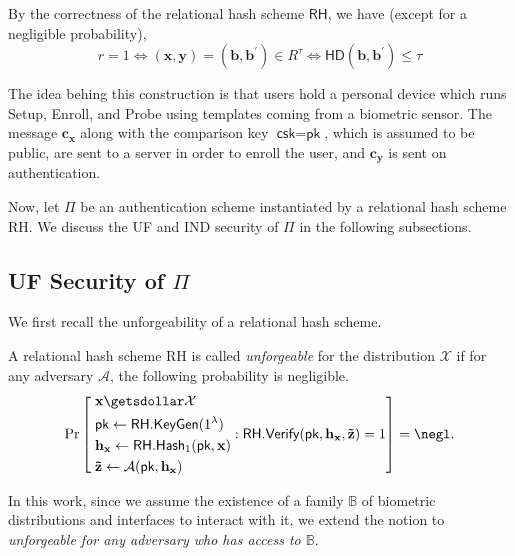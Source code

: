 By the correctness of the relational hash scheme $\textsf{RH}$, we have (except for a negligible probability),
\[
	r = 1 \Leftrightarrow (\mathbf{x}, \mathbf{y}) = (\mathbf{b}, \mathbf{b}^\prime) \in R^\tau \Leftrightarrow \textsf{HD}(\mathbf{b}, \mathbf{b}^\prime) \leq \tau
\]

The idea behing this construction is that users hold a personal device which runs \textsf{Setup}, \textsf{Enroll}, and \textsf{Probe} using templates coming from a biometric sensor. The message $\mathbf{c_x}$ along with the comparison key $\textsf{csk} = \textsf{pk}$, which is assumed to be public, are sent to a server in order to enroll the user, and $\mathbf{c_y}$ is sent on authentication.


Now, let $\Pi$ be an authentication scheme instantiated by a relational hash scheme \textsf{RH}. We discuss the UF and IND security of $\Pi$ in the following subsections.


\subsection{UF Security of $\Pi$}
\label{sec:security_analysis:rh:uf}

We first recall the unforgeability \cite{cryptoeprint:2014/394} of a relational hash scheme.

\begin{definition}[Unforgeability]

A relational hash scheme \textsf{RH} is called \emph{unforgeable} for the distribution $\mathcal{X}$ if for any adversary $\mathcal{A}$, the following probability is negligible.
\[
	\Pr \left [
		\begin{aligned} 
			 &\; \mathbf{x} \getsdollar \mathcal{X} \\
			 &\; \textsf{pk} \gets \textsf{RH.KeyGen}(1^\lambda) \\
			 &\; \mathbf{h_x} \gets \textsf{RH.Hash}_1(\textsf{pk}, \mathbf{x}) \\
			 &\; \mathbf{\tilde{z}} \gets \mathcal{A}(\textsf{pk}, \mathbf{h_x})
		\end{aligned} :
		\textsf{RH.Verify}(\textsf{pk}, \mathbf{h_x}, \mathbf{\tilde{z}}) = 1
		\right ] = \negl.
\]

\noindent In this work, since we assume the existence of a family $\mathbb{B}$ of biometric distributions and interfaces to interact with it, we extend the notion to \emph{unforgeable for any adversary who has access to $\mathbb{B}$}.
\end{definition}

